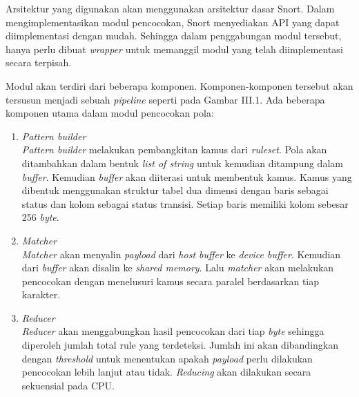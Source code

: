       Arsitektur yang digunakan akan menggunakan arsitektur dasar Snort. Dalam mengimplementasikan modul pencocokan, Snort menyediakan API yang dapat diimplementasi dengan mudah. Sehingga dalam penggabungan modul tersebut, hanya perlu dibuat \emph{wrapper} untuk memanggil modul yang telah diimplementasi secara terpisah.

      Modul akan terdiri dari beberapa komponen. Komponen-komponen tersebut akan tersusun menjadi sebuah \emph{pipeline} seperti pada Gambar III.1. Ada beberapa komponen utama dalam modul pencocokan pola:

      
      
      \begin{enumerate}

        \item 
        \emph{Pattern builder} \\
        \emph{Pattern builder} melakukan pembangkitan kamus dari \emph{ruleset}. Pola akan ditambahkan dalam bentuk \emph{list of string} untuk kemudian ditampung dalam \emph{buffer}. Kemudian \emph{buffer} akan diiterasi untuk membentuk kamus. Kamus yang dibentuk menggunakan struktur tabel dua dimensi dengan baris sebagai status dan kolom sebagai status transisi. Setiap baris memiliki kolom sebesar 256 \emph{byte}.

        \item
        \emph{Matcher} \\
        \emph{Matcher} akan menyalin \emph{payload} dari \emph{host buffer} ke \emph{device buffer}. Kemudian dari \emph{buffer} akan disalin ke \emph{shared memory}. Lalu \emph{matcher} akan melakukan pencocokan dengan menelusuri kamus secara paralel berdasarkan tiap karakter.

        \item
        \emph{Reducer} \\
        \emph{Reducer} akan menggabungkan hasil pencocokan dari tiap \emph{byte} sehingga diperoleh jumlah total rule yang terdeteksi. Jumlah ini akan dibandingkan dengan \emph{threshold} untuk menentukan apakah \emph{payload} perlu dilakukan pencocokan lebih lanjut atau tidak. \emph{Reducing} akan dilakukan secara sekuensial pada CPU.
        
      \end{enumerate}